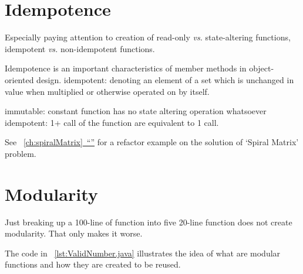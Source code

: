 \documentclass[oneside,11pt]{book}
\theoremstyle{definition}
\theoremstyle{remark}
\newcommand*{\fullref}[1]{\hyperref[{#1}]{\mbox{\autoref*{#1}~}``\nameref*{#1}''}}
\begin{document}
\section{Idempotence}\label{sec:idempotence}

Especially paying attention to creation
of read-only  \textit{vs.} state-altering functions,
idempotent  \textit{vs.} non-idempotent functions.

Idempotence is an important characteristics of member methods in object-oriented design.
idempotent: denoting an element of a set which is unchanged in value when multiplied or otherwise operated on by itself.

immutable: constant function has no state altering operation whatsoever
idempotent: 1+ call of the function are equivalent to 1 call.

See ~\fullref{ch:spiralMatrix} for a refactor example on the solution of `Spiral Matrix' problem.

\section{Modularity}

Just breaking up a 100-line of function into five 20-line function does not create modularity.
That only makes it worse.

The code in ~\autoref{lst:ValidNumber.java} illustrates the idea of what are modular functions and
how they are created to be reused.

\begin{clisting}
    
\end{clisting}
\end{document}
